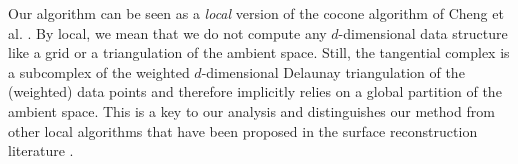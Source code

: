 Our algorithm can be seen as a {\em local} version of the cocone
algorithm of Cheng et al. \cite{manifold2}. By local, we mean that we
do not compute any $d$-dimensional data structure like a grid or a
triangulation of the ambient space. Still, the tangential complex is a
subcomplex of the weighted $d$-dimensional Delaunay triangulation of
the (weighted) data points and therefore implicitly relies on a global
partition of the ambient space. This is a key to our analysis and 
distinguishes our method %
from other local algorithms that have been proposed
in the surface reconstruction literature \cite{prisme-4564a,gopi}.
